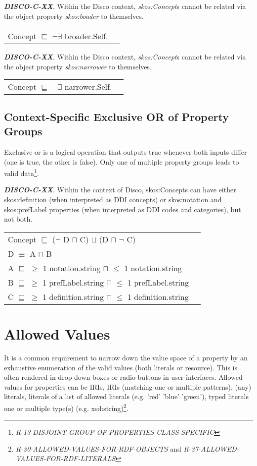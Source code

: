 \documentclass{elsart3p}    %
\newenvironment{DL}{
  \vspace{0cm}
  \begin{tabular}{l l}

}{
  \end{tabular}
}
\begin{document}
\textbf{{\em DISCO-C-XX}}.
Within the Disco context, {\em skos:Concept}s cannot be related via the object property {\em skos:boader} to themselves.

\begin{DL}
Concept $\sqsubseteq$ $\neg$$\exists$ broader.Self. 
\end{DL}

\textbf{{\em DISCO-C-XX}}.
Within the Disco context, {\em skos:Concept}s cannot be related via the object property {\em skos:narrower} to themselves. 

\begin{DL}
Concept $\sqsubseteq$ $\neg$$\exists$ narrower.Self. 
\end{DL}

\subsection{Context-Specific Exclusive OR of Property Groups}

Exclusive or is a logical operation that outputs true whenever both inputs differ (one is true, the other is false).
Only one of multiple property groups leads to valid data\footnote{{\em R-13-DISJOINT-GROUP-OF-PROPERTIES-CLASS-SPECIFIC}}.

\textbf{{\em DISCO-C-XX}}.
Within the context of Disco, skos:Concepts can have either skos:definition (when interpreted as DDI concepts) or skos:notation and skos:prefLabel properties (when interpreted as DDI codes and categories), but not both.

\begin{DL}
Concept $\sqsubseteq$ ($\neg$ D $\sqcap$ C) $\sqcup$ (D $\sqcap$ $\neg$ C) \\ 
D $\equiv$ A $\sqcap$ B \\
A $\sqsubseteq$ $\geq$ 1 notation.string $\sqcap$ $\leq$ 1 notation.string \\
B $\sqsubseteq$ $\geq$ 1 prefLabel.string $\sqcap$ $\leq$ 1 prefLabel.string \\
C $\sqsubseteq$ $\geq$ 1 definition.string $\sqcap$ $\leq$ 1 definition.string \\
\end{DL}

\section{Allowed Values}

It is a common requirement to narrow down the value space of a property by an exhaustive enumeration of the valid values (both literals or resource). 
This is often rendered in drop down boxes or radio buttons in user interfaces. 
Allowed values for properties can be IRIs, IRIs (matching one or multiple patterns), (any) literals, literals of a list of allowed literals (e.g. 'red' 'blue' 'green'), typed literals one or multiple type(s) (e.g. xsd:string)\footnote{{\em R-30-ALLOWED-VALUES-FOR-RDF-OBJECTS} and 
{\em R-37-ALLOWED-VALUES-FOR-RDF-LITERALS}}.
\end{document}
